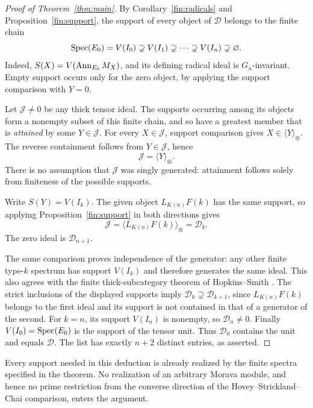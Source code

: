 \begin{proof}[Proof of Theorem~\ref{thm:main}]
By Corollary~\ref{fin:radicals} and
Proposition~\ref{fin:support}, the support of every object of
\(\mathcal D\) belongs to the finite chain
\[
 \operatorname{Spec}(E_0)=V(I_0)\supsetneq V(I_1)\supsetneq\cdots
       \supsetneq V(I_n)\supsetneq\varnothing.
\]
Indeed, \(S(X)=V(\operatorname{Ann}_{E_0}M_X)\), and its defining radical ideal is
\(G_n\)-invariant.
Empty support occurs only for the zero object, by applying the
support comparison with \(Y=0\).

Let \(\mathcal J\ne0\) be any thick tensor ideal.
The supports occurring among its objects form a nonempty subset
of this finite chain, and so have a greatest member that is
\emph{attained} by some \(Y\in\mathcal J\).
For every \(X\in\mathcal J\), support comparison gives
\(X\in\langle Y\rangle_\otimes\).
The reverse containment follows from \(Y\in\mathcal J\), hence
\[
  \mathcal J=\langle Y\rangle_\otimes.
\]
There is no assumption that \(\mathcal J\) was singly generated:
attainment follows solely from finiteness of the possible supports.

Write \(S(Y)=V(I_k)\).
The given object \(L_{K(n)}F(k)\) has the same support, so applying
Proposition~\ref{fin:support} in both directions gives
\[
  \mathcal J
    =\langle L_{K(n)}F(k)\rangle_\otimes
    =\mathcal D_k.
\]
The zero ideal is \(\mathcal D_{n+1}\).

The same comparison proves independence of the generator:
any other finite type-\(k\) spectrum has support \(V(I_k)\) and
therefore generates the same ideal.
This also agrees with the finite thick-subcategory theorem of
Hopkins--Smith \cite{HopkinsSmith98}.
The strict inclusions of the displayed supports imply
\(\mathcal D_k\supsetneq\mathcal D_{k+1}\), since
\(L_{K(n)}F(k)\) belongs to the first ideal and its support is not
contained in that of a generator of the second.
For \(k=n\), its support \(V(I_n)\) is nonempty, so
\(\mathcal D_n\ne0\).
Finally \(V(I_0)=\operatorname{Spec}(E_0)\) is the support of the tensor unit.
Thus \(\mathcal D_0\) contains the unit and equals \(\mathcal D\).
The list has exactly \(n+2\) distinct entries, as asserted.
\end{proof}

Every support needed in this deduction is already realized by the
finite spectra specified in the theorem.  No realization of an
arbitrary Morava module, and hence no prime restriction from the
converse direction of the Hovey--Strickland--Chai comparison, enters
the argument.



